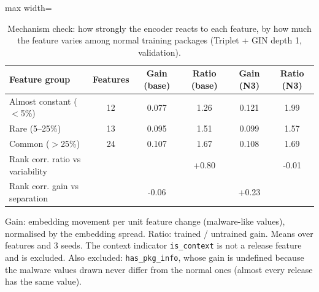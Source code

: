 \begin{table}[htbp]
\centering
\small
\caption{Mechanism check: how strongly the encoder reacts to each feature, by how much the feature varies among normal training packages (Triplet + GIN depth 1, validation).}
\label{tab:sensitivity}
\begin{adjustbox}{max width=\linewidth}
\begin{tabular}{lccccc}
\toprule
Feature group & Features & Gain (base) & Ratio (base) & Gain (N3) & Ratio (N3) \\
\midrule
Almost constant ($<$5\%) & 12 & 0.077 & 1.26 & 0.121 & 1.99 \\
Rare (5--25\%) & 13 & 0.095 & 1.51 & 0.099 & 1.57 \\
Common ($>$25\%) & 24 & 0.107 & 1.67 & 0.108 & 1.69 \\
\midrule
Rank corr. ratio vs variability &  &  & +0.80 &  & -0.01 \\
Rank corr. gain vs separation &  & -0.06 &  & +0.23 &  \\
\bottomrule
\end{tabular}
\end{adjustbox}
\par\smallskip
\parbox{0.95\linewidth}{\footnotesize Gain: embedding movement per unit feature change (malware-like values), normalised by the embedding spread. Ratio: trained / untrained gain. Means over features and 3 seeds. The context indicator \texttt{is\_context} is not a release feature and is excluded. Also excluded: \texttt{has\_pkg\_info}, whose gain is undefined because the malware values drawn never differ from the normal ones (almost every release has the same value).}
\end{table}
